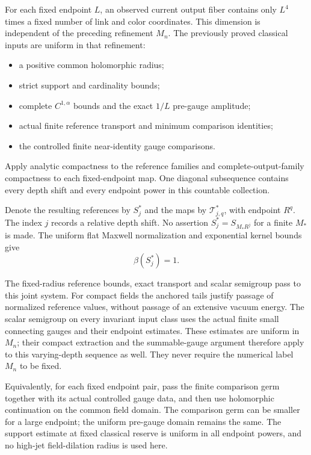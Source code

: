 \documentclass[11pt]{article}
\theoremstyle{remark}
\begin{document}
For each fixed endpoint \(L\), an observed current output
fiber contains only \(L^4\) times a fixed number of link
and color coordinates. This dimension is independent of
the preceding refinement \(M_n\). The previously proved
classical inputs are uniform in that refinement:
\begin{itemize}
 \item a positive common holomorphic radius;
 \item strict support and cardinality bounds;
 \item complete \(C^{1,\alpha}\) bounds and the exact
       \(1/L\) pre-gauge amplitude;
 \item actual finite reference transport and minimum
       comparison identities;
 \item the controlled finite near-identity gauge comparisons.
\end{itemize}
Apply analytic compactness to the reference families and
complete-output-family compactness to each fixed-endpoint
map. One diagonal subsequence contains every depth shift
and every endpoint power in this countable collection.

Denote the resulting references by \(S_j^*\) and the maps
by \(\mathcal T_{j,q}^*\), with endpoint \(R^q\). The index
\(j\) records a relative depth shift. No assertion
\(S_j^*=S_{M_*R^j}\) for a finite \(M_*\) is made.
The uniform flat Maxwell normalization and exponential
kernel bounds give
\begin{equation}
                           \beta(S_j^*)=1.
 \label{fml-reference-normalization}
\end{equation}

The fixed-radius reference bounds, exact transport and
scalar semigroup pass to this joint system. For compact
fields the anchored tails justify passage of normalized
reference values, without passage of an extensive vacuum
energy. The scalar semigroup on every invariant input
class uses the actual finite small connecting gauges
and their endpoint estimates. These estimates are uniform
in \(M_n\); their compact extraction and the summable-gauge
argument therefore apply to this varying-depth sequence
as well. They never require the numerical label \(M_n\)
to be fixed.

Equivalently, for each fixed endpoint pair, pass the finite
comparison germ together with its actual controlled gauge
data, and then use holomorphic continuation on the
common field domain. The comparison germ can be smaller
for a large endpoint; the uniform pre-gauge domain remains
the same. The support estimate at fixed classical reserve
is uniform in all endpoint powers, and no high-jet
field-dilation radius is used here.
\end{document}
